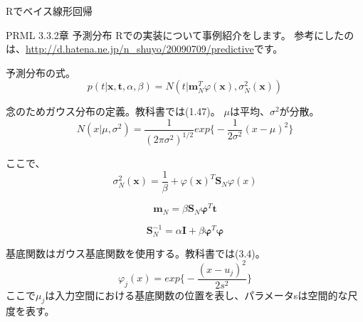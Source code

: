 \documentclass[uplatex]{jsarticle}
\begin{document}
Rでベイス線形回帰

PRML 3.3.2章 予測分布
Rでの実装について事例紹介をします。
参考にしたのは、\url{http://d.hatena.ne.jp/n_shuyo/20090709/predictive}です。

予測分布の式。
\begin{equation}
p(t|\mathbf{x},\mathbf{t},α,β)=\mathit{N}(t|\mathbf{m}^{T}_{N}φ(\mathbf{x}),σ^{2}_{N}(\mathbf{x}))
\end{equation}

念のためガウス分布の定義。教科書では(1.47)。
$μ$は平均、$σ^2$が分散。
\begin{equation}
N(x|μ,σ^2)=\frac{1}{(2πσ^2)^{1/2}}exp\biggl\{-\frac{1}{2σ^2}(x-μ)^2\biggl\}
\end{equation}

ここで、
\begin{equation}
σ^2_N(\mathbf{x})=\frac{1}{β}+φ(\mathbf{x})^T\mathbf{S}_Nφ(x)
\end{equation}

\begin{equation}
\mathbf{m}_N=β\mathbf{S}_N\mathbf{φ}^T\mathbf{t}
\end{equation}

\begin{equation}
\mathbf{S}^{-1}_N=α\mathbf{I}+β\mathbf{φ}^T\mathbf{φ}
\end{equation}

基底関数はガウス基底関数を使用する。教科書では(3.4)。
\begin{equation}
φ_j(x)=exp\biggl\{-\frac{(x-u_j)^2}{2s^2}\biggl\}
\end{equation}
ここで$μ_j$は入力空間における基底関数の位置を表し、パラメータsは空間的な尺度を表す。
\end{document}
